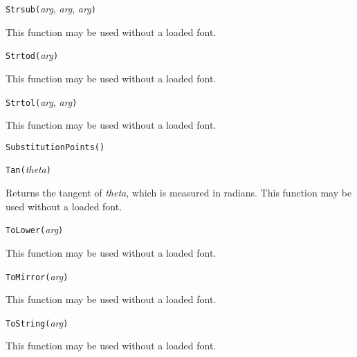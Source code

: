

\texttt{Strsub(}\textit{arg}, \textit{arg}, \textit{arg}\texttt{)}

This function may be used without a loaded font.



\texttt{Strtod(}\textit{arg}\texttt{)}

This function may be used without a loaded font.



\texttt{Strtol(}\textit{arg}, \textit{arg}\texttt{)}

This function may be used without a loaded font.



\texttt{SubstitutionPoints(}\texttt{)}



\texttt{Tan(}\textit{theta}\texttt{)}

Returns the tangent of \textit{theta}, which is measured in radians.
This function may be used without a loaded font.



\texttt{ToLower(}\textit{arg}\texttt{)}

This function may be used without a loaded font.



\texttt{ToMirror(}\textit{arg}\texttt{)}

This function may be used without a loaded font.



\texttt{ToString(}\textit{arg}\texttt{)}

This function may be used without a loaded font.



